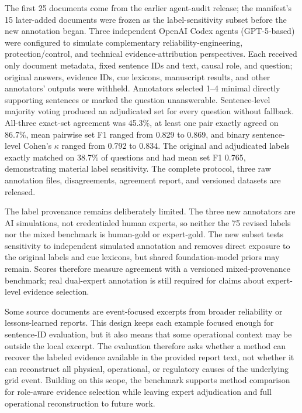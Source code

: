 \documentclass{article}
\begin{document}
The first 25 documents come from the earlier agent-audit release; the manifest's 15 later-added documents were frozen as the label-sensitivity subset before the new annotation began. Three independent OpenAI Codex agents (GPT-5-based) were configured to simulate complementary reliability-engineering, protection/control, and technical evidence-attribution perspectives. Each received only document metadata, fixed sentence IDs and text, causal role, and question; original answers, evidence IDs, cue lexicons, manuscript results, and other annotators' outputs were withheld. Annotators selected 1--4 minimal directly supporting sentences or marked the question unanswerable. Sentence-level majority voting produced an adjudicated set for every question without fallback. All-three exact-set agreement was 45.3\%, at least one pair exactly agreed on 86.7\%, mean pairwise set F1 ranged from 0.829 to 0.869, and binary sentence-level Cohen's $\kappa$ ranged from 0.792 to 0.834. The original and adjudicated labels exactly matched on 38.7\% of questions and had mean set F1 0.765, demonstrating material label sensitivity. The complete protocol, three raw annotation files, disagreements, agreement report, and versioned datasets are released.

The label provenance remains deliberately limited. The three new annotators are AI simulations, not credentialed human experts, so neither the 75 revised labels nor the mixed benchmark is human-gold or expert-gold. The new subset tests sensitivity to independent simulated annotation and removes direct exposure to the original labels and cue lexicons, but shared foundation-model priors may remain. Scores therefore measure agreement with a versioned mixed-provenance benchmark; real dual-expert annotation is still required for claims about expert-level evidence selection.

Some source documents are event-focused excerpts from broader reliability or lessons-learned reports. This design keeps each example focused enough for sentence-ID evaluation, but it also means that some operational context may be outside the local excerpt. The evaluation therefore asks whether a method can recover the labeled evidence available in the provided report text, not whether it can reconstruct all physical, operational, or regulatory causes of the underlying grid event. Building on this scope, the benchmark supports method comparison for role-aware evidence selection while leaving expert adjudication and full operational reconstruction to future work.
\end{document}
